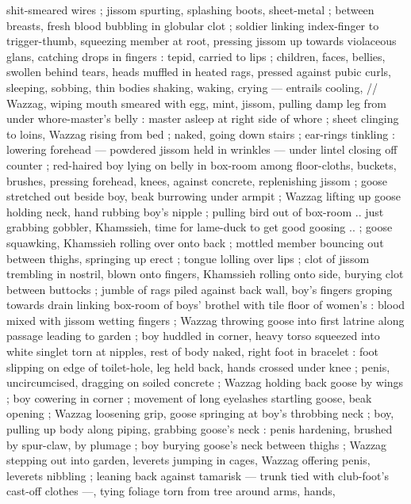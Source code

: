 \documentclass[10pt,twoside]{memoir}
\begin{document}
shit-smeared wires ; jissom spurting, splashing boots, sheet-metal ; 
between breasts, fresh blood bubbling in globular clot ; soldier 
linking index-finger to trigger-thumb, squeezing member at root, 
pressing jissom up towards violaceous glans, catching drops in 
fingers : tepid, carried to lips ; children, faces, bellies, swollen 
behind tears, heads muffled in heated rags, pressed against pubic 
curls, sleeping, sobbing, thin bodies shaking, waking, crying --- 
entrails cooling, // Wazzag, wiping mouth smeared with egg, mint, 
jissom, pulling damp leg from under whore-master's belly : master 
asleep at right side of whore ; sheet clinging to loins, Wazzag rising 
from bed ; naked, going down stairs ; ear-rings tinkling : lowering 
forehead --- powdered jissom held in wrinkles --- under lintel closing 
off counter ; red-haired boy lying on belly in box-room among floor-cloths,
buckets, brushes, pressing forehead, knees, against 
concrete, replenishing jissom ; goose stretched out beside boy, beak 
burrowing under armpit ; Wazzag lifting up goose holding neck, hand 
rubbing boy's nipple ; pulling bird out of box-room .. {\guillemotleft} just grabbing 
gobbler, Khamssieh, time for lame-duck to get good goosing .. {\guillemotright} ; 
goose squawking, Khamssieh rolling over onto back ; mottled %
member bouncing out between thighs, springing up erect ; tongue 
lolling over lips ; clot of jissom trembling in nostril, blown onto 
fingers, Khamssieh rolling onto side, burying clot between buttocks ; 
jumble of rags piled against back wall, boy's fingers groping towards 
drain linking box-room of boys' brothel with tile floor of women's : 
blood mixed with jissom wetting fingers ; Wazzag throwing goose into 
first latrine along passage leading to garden ; boy huddled in corner, 
heavy torso squeezed into white singlet torn at nipples, rest of body
naked, right foot in bracelet : foot slipping on edge of toilet-hole, leg
held back, hands crossed under knee ; penis, uncircumcised, 
dragging on soiled concrete ; Wazzag holding back goose by wings ; 
boy cowering in corner ; movement of long eyelashes startling 
goose, beak opening ; Wazzag loosening grip, goose springing at 
boy's throbbing neck ; boy, pulling up body along piping, grabbing 
goose's neck : penis hardening, brushed by spur-claw, by plumage ; 
boy burying goose's neck between thighs ; Wazzag stepping out into 
garden, leverets jumping in cages, Wazzag offering penis, leverets 
nibbling ; leaning back against tamarisk --- trunk tied with club-foot's 
cast-off clothes ---, tying foliage torn from tree around arms, hands, 
\end{document}
